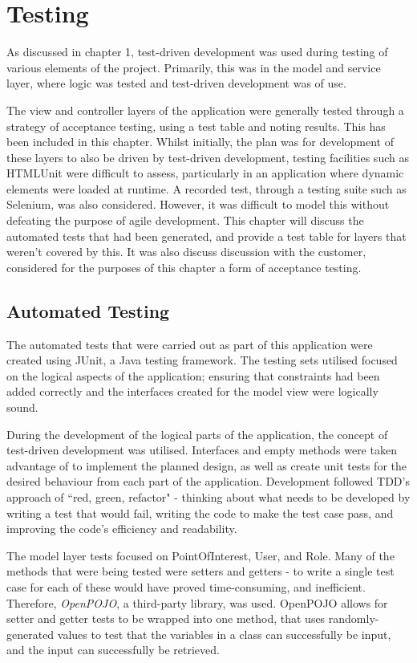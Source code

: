 \chapter{Testing}

As discussed in chapter 1, test-driven development was used during testing of various elements of the project. Primarily, this was in the model and service layer, where logic was tested and test-driven development was of use.

The view and controller layers of the application were generally tested through a strategy of acceptance testing, using a test table and noting results. This has been included in this chapter. Whilst initially, the plan was for development of these layers to also be driven by test-driven development, testing facilities such as HTMLUnit were difficult to assess, particularly in an application where dynamic elements were loaded at runtime. A recorded test, through a testing suite such as Selenium, was also considered. However, it was difficult to model this without defeating the purpose of agile development. This chapter will discuss the automated tests that had been generated, and provide a test table for layers that weren't covered by this. It was also discuss discussion with the customer, considered for the purposes of this chapter a form of acceptance testing.

\section{Automated Testing}

The automated tests that were carried out as part of this application were created using JUnit, a Java testing framework. The testing sets utilised focused on the logical aspects of the application; ensuring that constraints had been added correctly and the interfaces created for the model view were logically sound.

During the development of the logical parts of the application, the concept of test-driven development was utilised. Interfaces and empty methods were taken advantage of to implement the planned design, as well as create unit tests for the desired behaviour from each part of the application. Development followed TDD's approach of ``red, green, refactor" - thinking about what needs to be developed by writing a test that would fail, writing the code to make the test case pass, and improving the code's efficiency and readability.

The model layer tests focused on PointOfInterest, User, and Role. Many of the methods that were being tested were setters and getters - to write a single test case for each of these would have proved time-consuming, and inefficient. Therefore, \textit{OpenPOJO}\cite{OpenPOJO}, a third-party library, was used. OpenPOJO allows for setter and getter tests to be wrapped into one method, that uses randomly-generated values to test that the variables in a class can successfully be input, and the input can successfully be retrieved.

